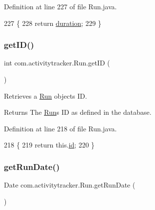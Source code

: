Definition at line 227 of file Run.\+java.


\begin{DoxyCode}
227                                \{
228         \textcolor{keywordflow}{return} \mbox{\hyperlink{classcom_1_1activitytracker_1_1_run_a5e38d293d29d4b65c9290ff4bee82e03}{duration}};
229     \}
\end{DoxyCode}
\mbox{\label{classcom_1_1activitytracker_1_1_run_a61916c14ab5a2bf6b080200f7d0c5566}} 
\subsubsection{\texorpdfstring{get\+I\+D()}{getID()}}
{\footnotesize\ttfamily int com.\+activitytracker.\+Run.\+get\+ID (\begin{DoxyParamCaption}{ }\end{DoxyParamCaption})}

Retrieves a \mbox{\hyperlink{classcom_1_1activitytracker_1_1_run}{Run}} object\textquotesingle{}s ID.

\begin{DoxyReturn}{Returns}
The \mbox{\hyperlink{classcom_1_1activitytracker_1_1_run}{Run}}\textquotesingle{}s ID as defined in the database. 
\end{DoxyReturn}


Definition at line 218 of file Run.\+java.


\begin{DoxyCode}
218                        \{
219         \textcolor{keywordflow}{return} this.\mbox{\hyperlink{classcom_1_1activitytracker_1_1_run_aa76717aee690b5bfe919d6e87dea1d84}{id}};
220     \}
\end{DoxyCode}
\mbox{\label{classcom_1_1activitytracker_1_1_run_a3673ace303ad8026cdc80a6d6e7e3533}} 
\subsubsection{\texorpdfstring{get\+Run\+Date()}{getRunDate()}}
{\footnotesize\ttfamily Date com.\+activitytracker.\+Run.\+get\+Run\+Date (\begin{DoxyParamCaption}{ }\end{DoxyParamCaption})}

